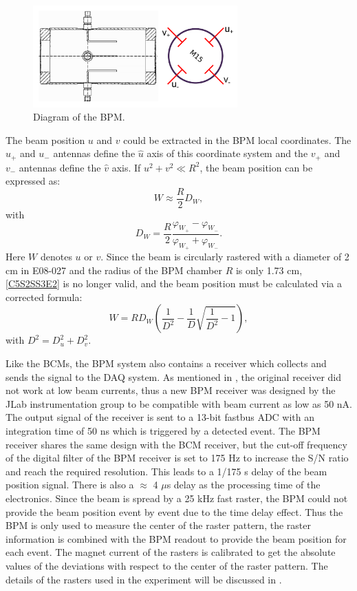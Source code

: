 \begin{figure}[b!]
  \centering
  \includegraphics[width=0.7\textwidth]{figs/bpm-design.png}
  \caption[Diagram of the BPM.]{Diagram of the BPM. \label{C5S2SS3F1}}
\end{figure}

The beam position $u$ and $v$ could be extracted in the BPM local coordinates. The $u_+$ and $u_-$ antennas define the $\hat{u}$ axis of this coordinate system and the $v_+$ and $v_-$ antennas define the $\hat{v}$ axis. If $u^2+v^2\ll R^2$, the beam position can be expressed as:
\begin{equation} \label{C5S2SS3E2}
W \approx \frac{R}{2}D_W,
\end{equation}
with
\begin{equation} \label{C5S2SS3E3}
D_W= \frac{R}{2}\frac{\varphi_{W_+}-\varphi_{W_-}}{\varphi_{W_+}+\varphi_{W_-}}.
\end{equation}
Here $W$ denotes $u$ or $v$. Since the beam is circularly rastered with a diameter of 2 cm in E08-027 and the radius of the BPM chamber $R$ is only 1.73 cm, \cref{C5S2SS3E2} is no longer valid, and the beam position must be calculated via a corrected formula:
\begin{equation} \label{C5S2SS3E4}
W = RD_W\left(\frac{1}{D^2}-\frac{1}{D}\sqrt{\frac{1}{D^2}-1}\right),
\end{equation}
with $D^2=D_u^2+D_v^2$.

Like the BCMs, the BPM system also contains a receiver which collects and sends the signal to the DAQ system. As mentioned in , the original receiver did not work at low beam currents, thus a new BPM receiver was designed by the JLab instrumentation group \cite{Musson2012} to be compatible with beam current as low as 50 nA. The output signal of the receiver is sent to a 13-bit fastbus ADC with an integration time of 50 ns which is triggered by a detected event. The BPM receiver shares the same design with the BCM receiver, but the cut-off frequency of the digital filter of the BPM receiver is set to 175 Hz to increase the S/N ratio and reach the required resolution. This leads to a 1/175 s delay of the beam position signal. There is also a $\approx$ 4 $\mu$s delay as the processing time of the electronics. Since the beam is spread by a 25 kHz fast raster, the BPM could not provide the beam position event by event due to the time delay effect. Thus the BPM is only used to measure the center of the raster pattern, the raster information is combined with the BPM readout to provide the beam position for each event. The magnet current of the rasters is calibrated to get the absolute values of the deviations with respect to the center of the raster pattern. The details of the rasters used in the experiment will be discussed in .

